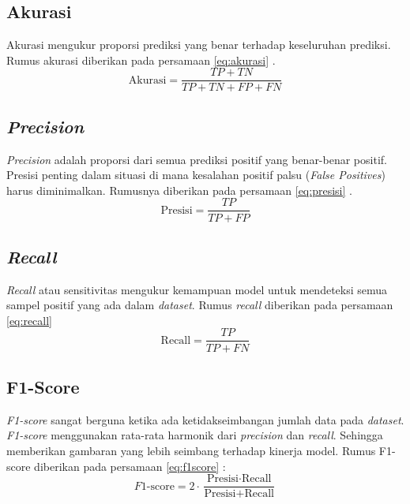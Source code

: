 \subsection{Akurasi}
\par Akurasi mengukur proporsi prediksi yang benar terhadap keseluruhan prediksi. Rumus akurasi diberikan pada persamaan \ref{eq:akurasi} \citep{han2011data}.
\begin{equation}
\text{Akurasi} = \frac{TP + TN}{TP + TN + FP + FN}
\label{eq:akurasi}
\end{equation}


\subsection{\textit{Precision}}
\par \textit{Precision} adalah proporsi dari semua prediksi positif yang benar-benar positif. Presisi penting dalam situasi di mana kesalahan positif palsu (\textit{False Positives}) harus diminimalkan. Rumusnya diberikan pada persamaan \ref{eq:presisi} \citep{powers2020evaluation}.
\begin{equation}
\text{Presisi} = \frac{TP}{TP + FP}
\label{eq:presisi}
\end{equation}

\subsection{\textit{Recall}}
\par \textit{Recall} atau sensitivitas mengukur kemampuan model untuk mendeteksi semua sampel positif yang ada dalam \textit{dataset}. Rumus \textit{recall} diberikan pada persamaan \ref{eq:recall} \citep{han2011data} 
\begin{equation}
\text{Recall} = \frac{TP}{TP + FN}
\label{eq:recall}
\end{equation}


\subsection{F1-Score}
\par \textit{F1-score} sangat berguna  ketika ada ketidakseimbangan jumlah data pada \textit{dataset}. \textit{F1-score} menggunakan rata-rata harmonik dari \textit{precision} dan \textit{recall}. Sehingga memberikan gambaran yang lebih seimbang terhadap kinerja model. Rumus F1-score diberikan pada persamaan \ref{eq:f1score} \citep{powers2020evaluation}:
\begin{equation}
F1\text{-score} = 2 \cdot \frac{\text{Presisi} \cdot \text{Recall}}{\text{Presisi} + \text{Recall}}
\label{eq:f1score}
\end{equation}

